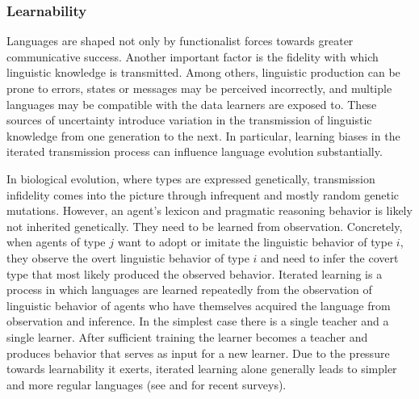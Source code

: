 \documentclass[a4paper, 11pt]{article}
\theoremstyle{Satz}
\begin{document}
\subsubsection{Learnability}
\label{sec:learnability}

Languages are shaped not only by functionalist forces towards greater communicative success. Another
important factor is the fidelity with which linguistic knowledge is transmitted. Among others,
linguistic production can be prone to errors, states or messages may be perceived incorrectly,
and multiple languages may be compatible with the data learners are exposed to. These sources
of uncertainty introduce variation in the transmission of linguistic knowledge from one
generation to the next. In particular, learning biases in the iterated transmission process can
influence language evolution substantially.

In biological evolution, where types are expressed genetically, transmission infidelity comes
into the picture through infrequent and mostly random genetic mutations. However, an agent's
lexicon and pragmatic reasoning behavior is likely not inherited genetically. They need to be
learned from observation. Concretely, when agents of type $j$ want to adopt or imitate the
linguistic behavior of type $i$, they observe the overt linguistic behavior of type $i$ and
need to infer the covert type that most likely produced the observed behavior. Iterated learning
is a process in which languages are learned repeatedly from the observation of linguistic
behavior of agents who have themselves acquired the language from observation and inference. In
the simplest case there is a single teacher and a single learner. After sufficient training the
learner becomes a teacher and produces behavior that serves as input for a new learner. Due to
the pressure towards learnability it exerts, iterated learning alone generally leads to simpler
and more regular languages (see \citealt{kirby+etal:2014} and \citealt{tamariz+kirby:2016} for
recent surveys).
\end{document}
